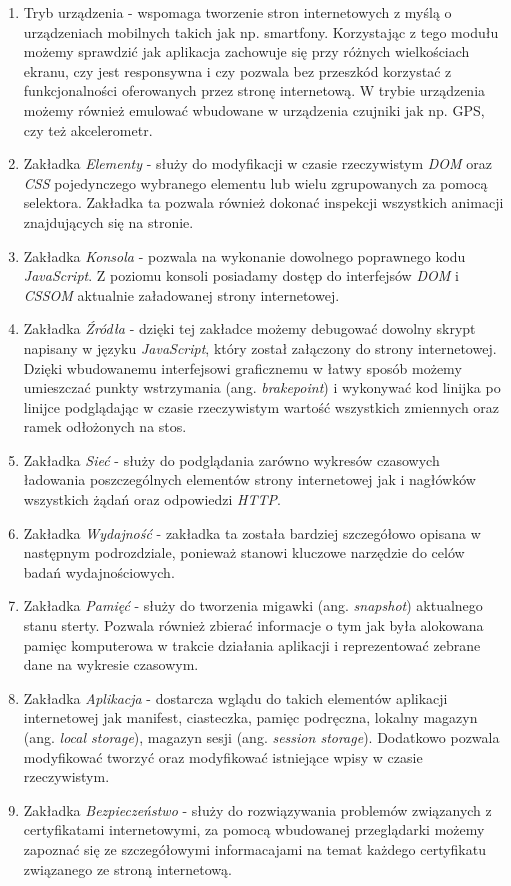 \documentclass[polish, twoside, 12pt]{mwart}
\begin{document}
\begin{enumerate}
  \item Tryb urządzenia - wspomaga tworzenie stron internetowych z myślą o urządzeniach mobilnych takich jak np. smartfony. Korzystając z tego modułu możemy sprawdzić jak aplikacja zachowuje się przy różnych wielkościach ekranu, czy jest responsywna i czy pozwala bez przeszkód korzystać z funkcjonalności oferowanych przez stronę internetową. W trybie urządzenia możemy również emulować wbudowane w urządzenia czujniki jak np. GPS, czy też akcelerometr.
  \item Zakładka \emph{Elementy} - służy do modyfikacji w czasie rzeczywistym \emph{DOM} oraz \emph{CSS} pojedynczego wybranego elementu lub wielu zgrupowanych za pomocą selektora. Zakładka ta pozwala również dokonać inspekcji wszystkich animacji znajdujących się na stronie.
  \item Zakładka \emph{Konsola} - pozwala na wykonanie dowolnego poprawnego kodu \emph{JavaScript}. Z poziomu konsoli posiadamy dostęp do interfejsów \emph{DOM} i \emph{CSSOM} aktualnie załadowanej strony internetowej.
  \item Zakładka \emph{Źródła} - dzięki tej zakładce możemy debugować dowolny skrypt napisany w języku \emph{JavaScript}, który został załączony do strony internetowej. Dzięki wbudowanemu interfejsowi graficznemu w łatwy sposób możemy umieszczać punkty wstrzymania (ang. \emph{brakepoint}) i wykonywać kod linijka po linijce podglądając w czasie rzeczywistym wartość wszystkich zmiennych oraz ramek odłożonych na stos.
  \item Zakładka \emph{Sieć} - służy do podglądania zarówno wykresów czasowych ładowania poszczególnych elementów strony internetowej jak i nagłówków wszystkich żądań oraz odpowiedzi \emph{HTTP}.
  \item Zakładka \emph{Wydajność} - zakładka ta została bardziej szczegółowo opisana w następnym podrozdziale, ponieważ stanowi kluczowe narzędzie do celów badań wydajnościowych.
  \item Zakładka \emph{Pamięć} - służy do tworzenia migawki (ang. \emph{snapshot}) aktualnego stanu sterty. Pozwala również zbierać informacje o tym jak była alokowana pamięc komputerowa w trakcie działania aplikacji i reprezentować zebrane dane na wykresie czasowym.
  \item Zakładka \emph{Aplikacja} - dostarcza wglądu do takich elementów aplikacji internetowej jak manifest, ciasteczka, pamięc podręczna, lokalny magazyn (ang. \emph{local storage}), magazyn sesji (ang. \emph{session storage}). Dodatkowo pozwala modyfikować tworzyć oraz modyfikować istniejące wpisy w czasie rzeczywistym.
  \item Zakładka \emph{Bezpieczeństwo} - służy do rozwiązywania problemów związanych z certyfikatami internetowymi, za pomocą wbudowanej przeglądarki możemy zapoznać się ze szczegółowymi informacajami na temat każdego certyfikatu związanego ze stroną internetową.
\end{enumerate}
\end{document}
